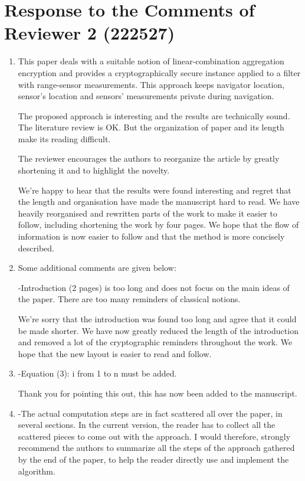 \documentclass[a4paper]{scrartcl}
\newenvironment{rebuttal}{\begin{enumerate}[label={\color{grey}\thesection.\arabic{enumi}},leftmargin=0pt,ref=\thesection.\arabic{enumi}]}{\end{enumerate}}
\newcommand{\reviewtext}[1]{{\color{nblue} #1}}
\begin{document}
\section*{Response to the Comments of Reviewer 2 (222527)}
\def\thesection{R2}
\begin{rebuttal}
\item \reviewtext{This paper deals with a suitable notion of linear-combination aggregation encryption and provides a cryptographically secure instance applied to a filter with range-sensor measurements. This approach keeps navigator location, sensor's location and sensors' measurements private during navigation.

The proposed approach is interesting and the results are technically sound. The literature review is OK. But the organization of paper and its length make its reading difficult.

The reviewer encourages the authors to reorganize the article by greatly shortening it and to highlight the novelty.}

We're happy to hear that the results were found interesting and regret that the length and organisation have made the manuscript hard to read. We have heavily reorganised and rewritten parts of the work to make it easier to follow, including shortening the work by four pages. We hope that the flow of information is now easier to follow and that the method is more concisely described.

\item \reviewtext{Some additional comments are given below:

-Introduction (2 pages) is too long and does not focus on the main ideas of the paper. There are too many reminders of classical notions.}

We're sorry that the introduction was found too long and agree that it could be made shorter. We have now greatly reduced the length of the introduction and removed a lot of the cryptographic reminders throughout the work. We hope that the new layout is easier to read and follow.

\item \reviewtext{-Equation (3): i from 1 to n must be added.}

Thank you for pointing this out, this has now been added to the manuscript.

\item \reviewtext{-The actual computation steps are in fact scattered all over the paper, in several sections.  In the current version, the reader has to collect all the scattered pieces to come out with the approach. I would therefore, strongly recommend the authors to summarize all the steps of the approach gathered by the end of the paper, to help the reader directly use and implement the algorithm.}


\end{rebuttal}
\end{document}
